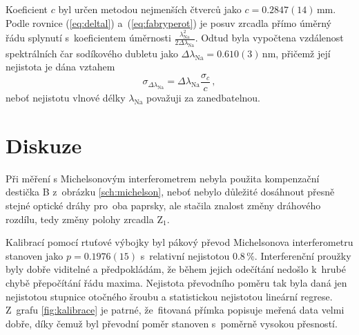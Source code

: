 \documentclass{../concepts/titul_protokol_p/prepareprotokol} %
\newcommand{\relative}[1]{
\frac{\sigma_{#1}}{#1}
}
\begin{document}
Koeficient $c$ byl určen metodou nejmenších čtverců jako $c = 0.2847(14)\,\unit{\mm}$. Podle rovnice
(\ref{eq:deltal}) a~(\ref{eq:fabryperot}) je posuv zrcadla přímo úměrný řádu splynutí s~koeficientem úměrnosti 
$\frac{\lambda_{\mathrm{Na}}^2}{2\Delta \lambda_{\mathrm{Na}}}$. Odtud
byla vypočtena vzdálenost spektrálních čar sodíkového dubletu jako
$\Delta \lambda_{\mathrm{Na}} = 0.610(3)\,\unit{\nm}$, přičemž její nejistota je dána vztahem
\begin{equation}
    \sigma_{\Delta \lambda_{\mathrm{Na}}} = \Delta \lambda_{\mathrm{Na}} \relative{c} \,,
    \label{sigmadeltalambda}
\end{equation}
neboť nejistotu vlnové délky $\lambda_{\mathrm{Na}}$ považuji za zanedbatelnou.

\section{Diskuze}

Při měření s Michelsonovým interferometrem nebyla použita kompenzační destička B z~obrázku \ref{sch:michelson},
neboť nebylo důležité dosáhnout přesně stejné optické dráhy pro~oba paprsky, ale stačila znalost změny
dráhového rozdílu, tedy změny polohy zrcadla $\mathrm{Z}_1$.

Kalibrací pomocí rtuťové výbojky byl pákový převod Michelsonova interferometru stanoven jako $p = 0.1976(15)$
s~relativní nejistotou $0.8\,\%$. Interferenční proužky byly dobře viditelné a předpokládám, že během jejich
odečítání nedošlo k~hrubé chybě přepočítání řádu maxima. Nejistota převodního poměru tak byla daná jen 
nejistotou stupnice otočného šroubu a statistickou nejistotou lineární regrese. Z~grafu \ref{fig:kalibrace}
je patrné, že~fitovaná přímka popisuje meřená data velmi dobře, díky čemuž byl převodní poměr stanoven
s~poměrně vysokou přesností.
\end{document}
